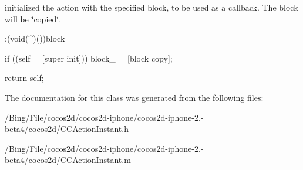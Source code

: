 initialized the action with the specified block, to be used as a callback. The block will be \char`\"{}copied\char`\"{}. 
\begin{DoxyCode}
                   :(void(^)())block
{
        if ((self = [super init]))
                block_ = [block copy];

        return self;
}
\end{DoxyCode}


The documentation for this class was generated from the following files\-:\begin{DoxyCompactItemize}
\item 
/\-Bing/\-File/cocos2d/cocos2d-\/iphone/cocos2d-\/iphone-\/2.-\/beta4/cocos2d/C\-C\-Action\-Instant.\-h\item 
/\-Bing/\-File/cocos2d/cocos2d-\/iphone/cocos2d-\/iphone-\/2.-\/beta4/cocos2d/C\-C\-Action\-Instant.\-m\end{DoxyCompactItemize}
